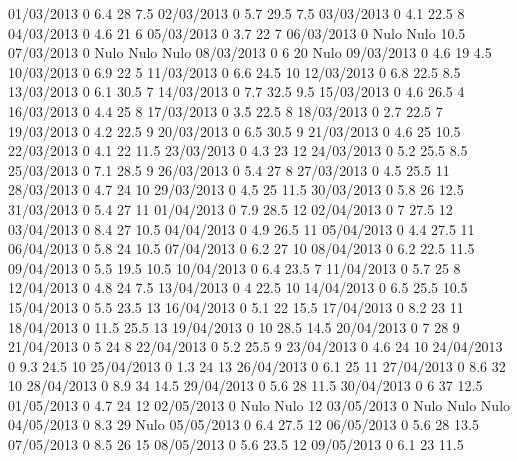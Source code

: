 01/03/2013  0      6.4    28     7.5 
02/03/2013  0      5.7    29.5   7.5 
03/03/2013  0      4.1    22.5   8 
04/03/2013  0      4.6    21     6 
05/03/2013  0      3.7    22     7 
06/03/2013  0     Nulo   Nulo    10.5 
07/03/2013  0     Nulo   Nulo   Nulo
08/03/2013  0      6      20    Nulo
09/03/2013  0      4.6    19     4.5 
10/03/2013  0      6.9    22     5 
11/03/2013  0      6.6    24.5   10 
12/03/2013  0      6.8    22.5   8.5 
13/03/2013  0      6.1    30.5   7 
14/03/2013  0      7.7    32.5   9.5 
15/03/2013  0      4.6    26.5   4 
16/03/2013  0      4.4    25     8 
17/03/2013  0      3.5    22.5   8 
18/03/2013  0      2.7    22.5   7 
19/03/2013  0      4.2    22.5   9 
20/03/2013  0      6.5    30.5   9 
21/03/2013  0      4.6    25     10.5 
22/03/2013  0      4.1    22     11.5 
23/03/2013  0      4.3    23     12 
24/03/2013  0      5.2    25.5   8.5 
25/03/2013  0      7.1    28.5   9 
26/03/2013  0      5.4    27     8 
27/03/2013  0      4.5    25.5   11 
28/03/2013  0      4.7    24     10 
29/03/2013  0      4.5    25     11.5 
30/03/2013  0      5.8    26     12.5 
31/03/2013  0      5.4    27     11 
01/04/2013  0      7.9    28.5   12 
02/04/2013  0      7      27.5   12 
03/04/2013  0      8.4    27     10.5 
04/04/2013  0      4.9    26.5   11 
05/04/2013  0      4.4    27.5   11 
06/04/2013  0      5.8    24     10.5 
07/04/2013  0      6.2    27     10 
08/04/2013  0      6.2    22.5   11.5 
09/04/2013  0      5.5    19.5   10.5 
10/04/2013  0      6.4    23.5   7 
11/04/2013  0      5.7    25     8 
12/04/2013  0      4.8    24     7.5 
13/04/2013  0      4      22.5   10 
14/04/2013  0      6.5    25.5   10.5 
15/04/2013  0      5.5    23.5   13 
16/04/2013  0      5.1    22     15.5 
17/04/2013  0      8.2    23     11 
18/04/2013  0      11.5   25.5   13 
19/04/2013  0      10     28.5   14.5 
20/04/2013  0      7      28     9 
21/04/2013  0      5      24     8 
22/04/2013  0      5.2    25.5   9 
23/04/2013  0      4.6    24     10 
24/04/2013  0      9.3    24.5   10 
25/04/2013  0      1.3    24     13 
26/04/2013  0      6.1    25     11 
27/04/2013  0      8.6    32     10 
28/04/2013  0      8.9    34     14.5 
29/04/2013  0      5.6    28     11.5 
30/04/2013  0      6      37     12.5 
01/05/2013  0      4.7    24     12 
02/05/2013  0     Nulo   Nulo    12 
03/05/2013  0     Nulo   Nulo   Nulo
04/05/2013  0      8.3    29    Nulo
05/05/2013  0      6.4    27.5   12 
06/05/2013  0      5.6    28     13.5 
07/05/2013  0      8.5    26     15 
08/05/2013  0      5.6    23.5   12 
09/05/2013  0      6.1    23     11.5 
